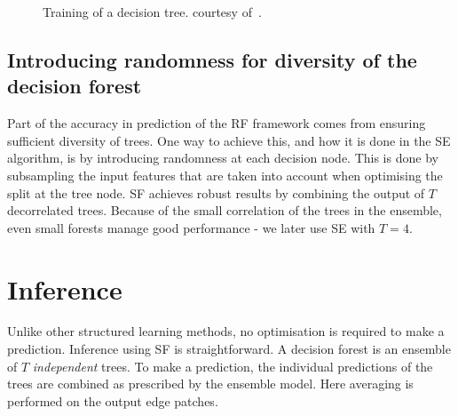 \begin{figure}[ht!]
\centering
\caption{Training of a decision tree. \protect{} courtesy of~\cite{DollarICCV13PresentationSlides}.}
\label{fig:srf-training}
\end{figure}

\subsection*{Introducing randomness for diversity of the decision forest}
Part of the accuracy in prediction of the RF framework comes from ensuring sufficient diversity of trees. One way to achieve this, and how it is done in the SE algorithm, is by introducing randomness at each decision node. This is done by subsampling the input features that are taken into account when optimising the split at the tree node. SF achieves robust results by combining the output of $T$ decorrelated trees. Because of the small correlation of the trees in the ensemble, even small forests manage good performance - we later use SE with $T=4$.

\section{Inference}
Unlike other structured learning methods, no optimisation is required to make a prediction. Inference using SF is straightforward. A decision forest is an ensemble of $T$ \textit{independent} trees. To make a prediction, the individual predictions of the trees are combined as prescribed by the ensemble model. Here averaging is performed on the output edge patches.

